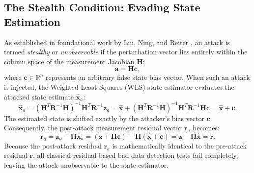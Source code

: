 \documentclass[12pt,a4paper]{report}
\begin{document}
\subsection{The Stealth Condition: Evading State Estimation}
As established in foundational work by Liu, Ning, and Reiter \cite{liu2009}, an attack is
termed \textit{stealthy} or \textit{unobservable} if the perturbation vector lies entirely
within the column space of the measurement Jacobian $\boldsymbol{H}$:
\begin{equation}
\boldsymbol{a} = \boldsymbol{H}\boldsymbol{c},
\label{eq:stealth_condition}
\end{equation}
where $\boldsymbol{c} \in \mathbb{R}^n$ represents an arbitrary false state bias vector.
When such an attack is injected, the Weighted Least-Squares (WLS) state estimator
evaluates the attacked state estimate $\hat{\boldsymbol{x}}_a$:
\begin{equation}
\hat{\boldsymbol{x}}_a = (\boldsymbol{H}^T\boldsymbol{R}^{-1}\boldsymbol{H})^{-1}\boldsymbol{H}^T\boldsymbol{R}^{-1}\boldsymbol{z}_a = \hat{\boldsymbol{x}} + (\boldsymbol{H}^T\boldsymbol{R}^{-1}\boldsymbol{H})^{-1}\boldsymbol{H}^T\boldsymbol{R}^{-1}\boldsymbol{H}\boldsymbol{c} = \hat{\boldsymbol{x}} + \boldsymbol{c}.
\end{equation}
The estimated state is shifted exactly by the attacker's bias vector $\boldsymbol{c}$.
Consequently, the post-attack measurement residual vector $\boldsymbol{r}_a$ becomes:
\begin{equation}
\boldsymbol{r}_a = \boldsymbol{z}_a - \boldsymbol{H}\hat{\boldsymbol{x}}_a = (\boldsymbol{z} + \boldsymbol{H}\boldsymbol{c}) - \boldsymbol{H}(\hat{\boldsymbol{x}} + \boldsymbol{c}) = \boldsymbol{z} - \boldsymbol{H}\hat{\boldsymbol{x}} = \boldsymbol{r}.
\end{equation}
Because the post-attack residual $\boldsymbol{r}_a$ is mathematically identical to the
pre-attack residual $\boldsymbol{r}$, all classical residual-based bad data detection
tests fail completely, leaving the attack unobservable to the state estimator.
\end{document}
